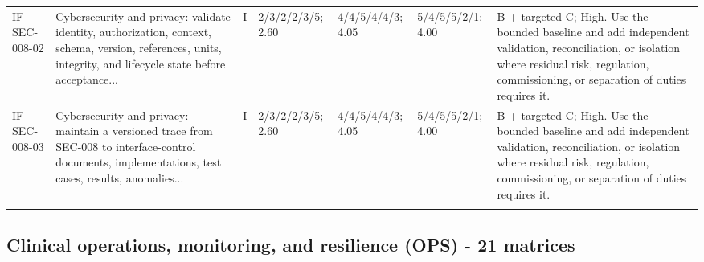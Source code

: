 \documentclass[11pt,letterpaper]{article}
\begin{document}
\begin{scriptsize}
\begin{longtable}{@{}L{0.11\textwidth}L{0.165\textwidth}L{0.04\textwidth}L{0.115\textwidth}L{0.115\textwidth}L{0.115\textwidth}L{0.235\textwidth}@{}}
\addlinespace[2pt]
IF-SEC-008-02 & Cybersecurity and privacy: validate identity, authorization, context, schema, version, references, units, integrity, and lifecycle state before acceptance... & I & 2/3/2/2/3/5; 2.60 & 4/4/5/4/4/3; 4.05 & 5/4/5/5/2/1; 4.00 & B + targeted C; High. Use the bounded baseline and add independent validation, reconciliation, or isolation where residual risk, regulation, commissioning, or separation of duties requires it. \\
\addlinespace[2pt]
IF-SEC-008-03 & Cybersecurity and privacy: maintain a versioned trace from SEC-008 to interface-control documents, implementations, test cases, results, anomalies... & I & 2/3/2/2/3/5; 2.60 & 4/4/5/4/4/3; 4.05 & 5/4/5/5/2/1; 4.00 & B + targeted C; High. Use the bounded baseline and add independent validation, reconciliation, or isolation where residual risk, regulation, commissioning, or separation of duties requires it. \\
\addlinespace[2pt]
\end{longtable}
\end{scriptsize}

\subsection{Clinical operations, monitoring, and resilience (OPS) - 21 matrices}
\end{document}
